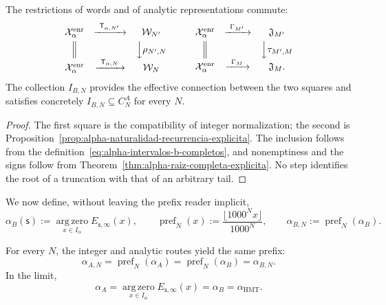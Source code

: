 \begin{proposition}
\label{prop:alpha-cuadrados-compatibilidad}
The restrictions of words and of analytic representations commute:
\[
\begin{array}{ccc}
 \mathcal X_\alpha^{\mathrm{enr}}&
 \xrightarrow{\ \mathsf T_{\alpha,N'}\ }&\mathcal W_{N'}\\[1mm]
 \Big\Vert&&\Big\downarrow\rho_{N',N}\\[1mm]
 \mathcal X_\alpha^{\mathrm{enr}}&
 \xrightarrow{\ \mathsf T_{\alpha,N}\ }&\mathcal W_N
\end{array}
\qquad
\begin{array}{ccc}
 \mathcal X_\alpha^{\mathrm{enr}}&
 \xrightarrow{\ \Gamma_{M'}\ }&\mathfrak J_{M'}\\[1mm]
 \Big\Vert&&\Big\downarrow\tau_{M',M}\\[1mm]
 \mathcal X_\alpha^{\mathrm{enr}}&
 \xrightarrow{\ \Gamma_M\ }&\mathfrak J_M .
\end{array}
\]
The collection \(I_{B,N}\) provides the effective connection between the two
squares and satisfies concretely
\(I_{B,N}\subseteq C_N^A\) for every \(N\).
\end{proposition}

\begin{proof}
The first square is the compatibility of integer normalization; the second
is Proposition~\ref{prop:alpha-naturalidad-recurrencia-explicita}. The
inclusion follows from the definition~\eqref{eq:alpha-intervalos-b-completos},
and nonemptiness and the signs follow from
Theorem~\ref{thm:alpha-raiz-completa-explicita}. No step identifies the
root of a truncation with that of an arbitrary tail.
\end{proof}

We now define, without leaving the prefix reader implicit,
\begin{equation}
 \alpha_B(\mathsf s):=
 \operatorname*{arg\,zero}_{x\in I_\alpha}E_{\mathsf s,\infty}(x),
 \qquad
 \operatorname{pref}_N(x):=
 \frac{\lfloor1000^Nx\rfloor}{1000^N},
 \qquad
 \alpha_{B,N}:=\operatorname{pref}_N(\alpha_B).
 \label{eq:alpha-definicion-b-y-prefijos-rev08}
\end{equation}

\begin{theorem}
\label{thm:alpha-dos-publicaciones-completas}
For every \(N\), the integer and analytic routes yield the same prefix:
\begin{equation}
 \boxed{\alpha_{A,N}=\operatorname{pref}_N(\alpha_A)
 =\operatorname{pref}_N(\alpha_B)=\alpha_{B,N}.}
 \label{eq:alpha-dos-vias-cada-nivel}
\end{equation}
In the limit,
\begin{equation}
 \boxed{\alpha_A
 =\operatorname*{arg\,zero}_{x\in I_\alpha}
       E_{\mathsf s,\infty}(x)
 =\alpha_B=\alpha_{\mathrm{HMT}}.}
 \label{eq:alpha-dos-vias-limite-coinductivo}
\end{equation}
\end{theorem}

